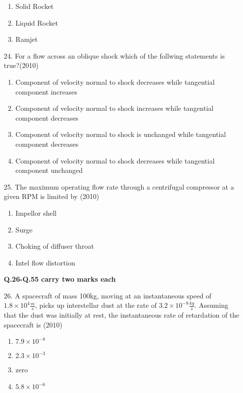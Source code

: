\documentclass[journal]{IEEEtran}
\begin{document}
\begin{enumerate}
\begin{enumerate}[label=(\Alph*)]
    \item Solid Rocket
    \item Liquid Rocket
    \item Ramjet
 \end{enumerate}
\item[24.] For a flow across an oblique shock which of the follwing statements is true?\hfill (2010)
\begin{enumerate}[label=(\Alph*)]
    \item Component of velocity normal to shock decreases while tangential component increases
    \item Component of velocity normal to shock increases while tangential component decreases
    \item Component of velocity normal to shock is unchanged while tangential component decreases
    \item Component of velocity normal to shock decreases while tangential component unchanged
\end{enumerate}
\item[25.] The maximum operating flow rate through a centrifugal compressor at a given RPM is limited by \hfill (2010) 
\begin{enumerate}[label=(\Alph*)]
    \item Impellor shell
    \item Surge
    \item Choking of diffuser throat
    \item Intel flow distortion
\end{enumerate}
\textbf{Q.26-Q.55 carry two marks each}
\item[26.] A spacecraft of mass 100kg, moving at an instantaneous speed of $1.8\times 10^4\frac{m}{s}$, picks up interstellar dust at the rate of $3.2\times 10^{-8}\frac{kg}{s}$. Assuming that the dust was initially at rest, the instantaneous rate of retardation of the spacecraft is \hfill (2010)
\begin{enumerate}[label=(\Alph*)]
    \item $7.9\times10^{-8}$
    \item $2.3\times10^{-3}$
    \item zero
    \item $5.8\times10^{-6}$
\end{enumerate}
\end{enumerate}
\end{document}
